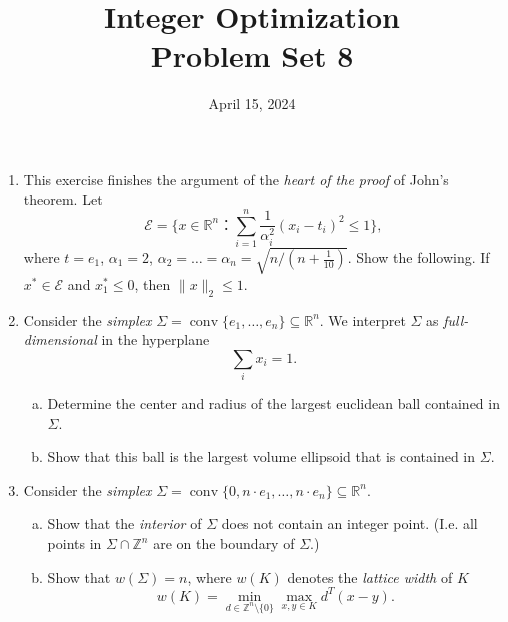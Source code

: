 \documentclass[11pt,a4paper]{article}
\title{Integer Optimization  \\ Problem Set 8 }
\date{ April 15, 2024}
\renewcommand{\leq}{\leqslant}
\DeclareMathOperator{\conv}{conv}
\begin{document}
\maketitle 


\begin{enumerate}



\item This exercise finishes the argument of the \emph{heart of the proof} of John's theorem. Let
  \begin{displaymath}
    ℰ = \{ x ∈ ℝ^n ： ∑_{i=1}^n \frac{1}{α_i^2} (x_i - t_i)^2 ≤ 1\},  
  \end{displaymath}
  where $t = e_1$, $α_1 = 2$, $α_2=\dots=α_n  = \sqrt{n / \left(n+ \frac{1}{10}\right)}$. Show the following. If $x^* ∈ ℰ$ and $x^*_1 ≤0$, then $\|x\|_2 ≤ 1$.  
  

 
\item Consider the \emph{simplex} $Σ = \conv \{e_1,\dots,e_n\} ⊆ ℝ^n$. We interpret $Σ$ as \emph{full-dimensional} in the hyperplane
  \begin{displaymath}
    ∑_i x_i = 1. 
  \end{displaymath}
  
  \begin{enumerate}[a)]
   
  \item Determine the center and radius of the largest euclidean ball contained in $Σ$.
  \item Show that this ball is the largest volume ellipsoid that is contained in $Σ$.
  \end{enumerate}
  
  

\item Consider  the \emph{simplex} $Σ = \conv \{0, n⋅e_1,\dots,n⋅e_n\} ⊆ ℝ^n$.
  \begin{enumerate}[a)]
  \item Show that the \emph{interior} of $Σ$ does not contain an integer point. (I.e. all points in $Σ ∩ℤ^n$ are on the boundary of $Σ$.)
  \item Show that $w(Σ) = n$, where $w(K)$ denotes the \emph{lattice width} of $K$
  \begin{displaymath}
    w(K) = \min_{d ∈ ℤ^n \setminus \{0\}} \max_{x,y ∈K} d^T(x - y).
  \end{displaymath}
  
 \end{enumerate}
  

\end{enumerate}
\end{document}
